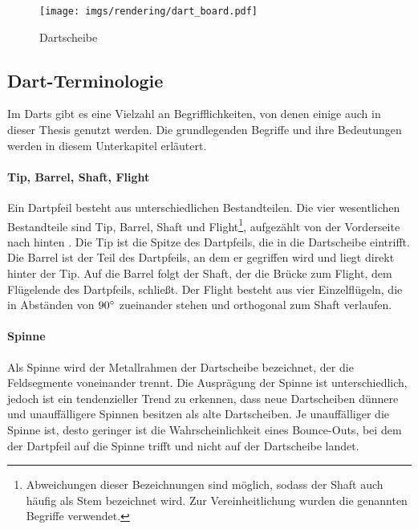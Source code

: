 \begin{figure}
    \centering
    \texttt{[image: imgs/rendering/dart\_board.pdf]}
    \caption{Dartscheibe}
    \label{img:dart_board}
\end{figure}



\subsection{Dart-Terminologie}
\label{sec:dart_terminologie}

Im Darts gibt es eine Vielzahl an Begrifflichkeiten, von denen einige auch in dieser Thesis genutzt werden. Die grundlegenden Begriffe und ihre Bedeutungen werden in diesem Unterkapitel erläutert.

\paragraph{Tip, Barrel, Shaft, Flight}

Ein Dartpfeil besteht aus unterschiedlichen Bestandteilen. Die vier wesentlichen Bestandteile sind Tip, Barrel, Shaft und Flight\footnote{Abweichungen dieser Bezeichnungen sind möglich, sodass der Shaft auch häufig als Stem bezeichnet wird. Zur Vereinheitlichung wurden die genannten Begriffe verwendet.}, aufgezählt von der Vorderseite nach hinten \cite{wdf-rules,pdc_rules}. Die Tip ist die Spitze des Dartpfeils, die in die Dartscheibe eintrifft. Die Barrel ist der Teil des Dartpfeils, an dem er gegriffen wird und liegt direkt hinter der Tip. Auf die Barrel folgt der Shaft, der die Brücke zum Flight, dem Flügelende des Dartpfeils, schließt. Der Flight besteht aus vier Einzelflügeln, die in Abständen von $90^{\circ}$ zueinander stehen und orthogonal zum Shaft verlaufen.

\paragraph{Spinne}

Als Spinne wird der Metallrahmen der Dartscheibe bezeichnet, der die Feldsegmente voneinander trennt. Die Ausprägung der Spinne ist unterschiedlich, jedoch ist ein tendenzieller Trend zu erkennen, dass neue Dartscheiben dünnere und unauffälligere Spinnen besitzen als alte Dartscheiben. Je unauffälliger die Spinne ist, desto geringer ist die Wahrscheinlichkeit eines Bounce-Outs, bei dem der Dartpfeil auf die Spinne trifft und nicht auf der Dartscheibe landet.

